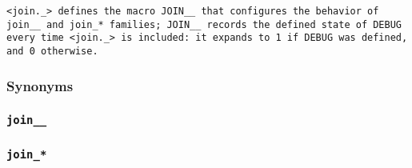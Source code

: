 \def\Subsubsection#1{\subsubsection{#1}}

\tt{<join._>} defines the macro \tt{JOIN__} that configures the behavior
of \tt{join__} and \tt{join_}* families; \tt{JOIN__} records the \tt{defined}
state of \tt{DEBUG} every time \tt{<join._>} is included:
it expands to \tt{1} if \tt{DEBUG} was defined, and \tt{0} otherwise.

\Subsubsection{Synonyms}

\subsubsection{\tt{join__}}


\subsubsection{\tt{join_}*}

